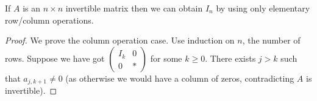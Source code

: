 \documentclass[a4paper]{article}
\theoremstyle{definition}
\begin{document}
\begin{lem}
  If \(A\) is an \(n\times n\) invertible matrix then we can obtain \(I_n\) by using only elementary row/column operations.
\end{lem}

\begin{proof}
  We prove the column operation case. Use induction on \(n\), the number of rows. Suppose we have got \(\begin{pmatrix} I_k & 0 \\ 0 & * \end{pmatrix}\) for some \(k\geq 0\). There exists \(j>k\) such that \(a_{j,k+1}\neq 0\) (as otherwise we would have a column of zeros, contradicting \(A\) is invertible).
\end{proof}
\end{document}
